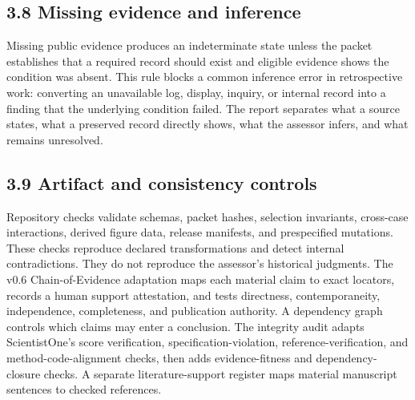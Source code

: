\documentclass[11pt]{article}
\begin{document}
\subsection*{3.8 Missing evidence and inference}
Missing public evidence produces an indeterminate state unless the packet establishes that a required record should exist and eligible evidence shows the condition was absent. This rule blocks a common inference error in retrospective work: converting an unavailable log, display, inquiry, or internal record into a finding that the underlying condition failed. The report separates what a source states, what a preserved record directly shows, what the assessor infers, and what remains unresolved.
\subsection*{3.9 Artifact and consistency controls}
Repository checks validate schemas, packet hashes, selection invariants, cross-case interactions, derived figure data, release manifests, and prespecified mutations. These checks reproduce declared transformations and detect internal contradictions. They do not reproduce the assessor's historical judgments.
The v0.6 Chain-of-Evidence adaptation maps each material claim to exact locators, records a human support attestation, and tests directness, contemporaneity, independence, completeness, and publication authority. A dependency graph controls which claims may enter a conclusion. The integrity audit adapts ScientistOne's score verification, specification-violation, reference-verification, and method-code-alignment checks, then adds evidence-fitness and dependency-closure checks. A separate literature-support register maps material manuscript sentences to checked references.
\end{document}
